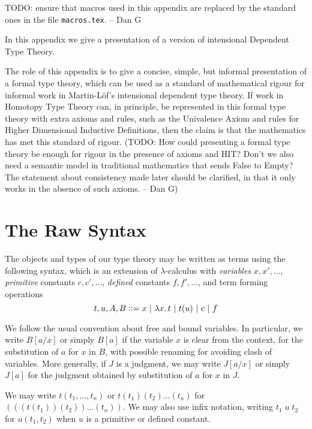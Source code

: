 {\newcommand{\Fam}{{\sf Fam}}
\newcommand{\pacomment}[1]{}
\newcommand{\myrefl}[1]{{\sf refl_{#1}}}

TODO: ensure that macros used in this appendix are replaced by the standard
ones in the file {\tt macros.tex}. -- Dan G

In this appendix we give a presentation of a version of intensional
Dependent Type Theory. 

The role of this appendix is to give a concise, simple, but informal
presentation of a formal type theory, which can be 
used as a standard of mathematical rigour for informal work in
Martin-L\"{o}f's intensional dependent type theory.  If work in
Homotopy Type Theory can, in principle, be represented in this formal
type theory with extra axioms and rules, such as the Univalence Axiom and
rules for Higher Dimensional Inductive Definitions,
then the claim is that the mathematics has met this standard of
rigour. (TODO: How could presenting a formal type theory be enough for
rigour in the presence of axioms and HIT?  Don't we also need a semantic 
model in traditional mathematics that sends False to Empty? The statement about
consistency made later should be clarified, in that it only works in the absence
of such axioms. -- Dan G)

\section*{The Raw Syntax}
 The objects and types of our type theory may be written as terms using the following syntax, which is an extension
of $\lambda$-calculus with {\em variables} $x, x',\dots$, {\em primitive} constants $c,c',\dots$, {\em defined} constants $f,f',\dots$, and term
forming operations
$$
t,u,A,B\production x~|~\lam{x} t~|~t(u)~|~c~|~f
$$

 We follow the usual convention about free and bound variables. In particular,
we write $B[a/x]$ or simply $B[a]$ if the variable $x$ is clear from the context, for the 
substitution of $a$ for $x$ in $B$, with possible renaming for avoiding clash of variables.
More generally, if $J$ is a judgment, we may write $J[a/x]$ or simply $J[a]$ for the 
judgment obtained by substitution of $a$ for $x$ in $J$.

\medskip

 We may write $t(t_1,\dots,t_n)$ or $t(t_1)(t_2)\dots (t_n)$ for $(((t(t_1))(t_2))\dots (t_n))$.  We may also use infix notation, writing $t_1\; u\; t_2$ for $u(t_1,t_2)$ when $u$ is a primitive or defined constant.

}
